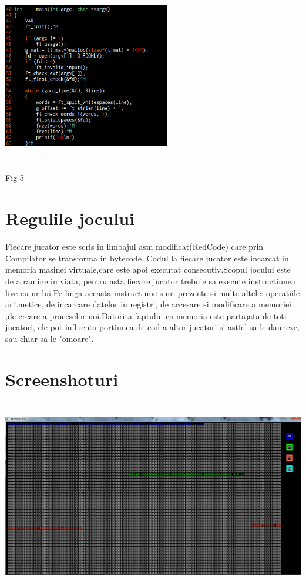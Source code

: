 \begin{center}
~\\
\includegraphics[width=7.3cm, height=8.5cm]{5.eps}
~\\
Fig 5
\end{center}

\section{Regulile jocului}
Fiecare jucator este scris in limbajul asm modificat(RedCode) care prin Compilator se transforma in bytecode.
Codul la fiecare jucator este incarcat in memoria masinei virtuale,care este apoi executat consecutiv.Scopul jocului este de a ramine in viata, pentru asta fiecare jucator trebuie sa execute instructiunea live cu nr lui.Pe linga aceasta instructiune sunt prezente si multe altele: operatiile aritmetice, de incarcare datelor in registri, de accesare si modificare a memoriei ,de creare a proceselor noi.Datorita faptului ca memoria este partajata de toti jucatori, ele pot influenta portiunea de cod a altor jucatori si astfel sa le dauneze, sau chiar sa le "omoare".

\clearpage
\section{Screenshoturi}
\begin{center}
\includegraphics[width=14cm, height=8.5cm]{7.eps}
\end{center}

